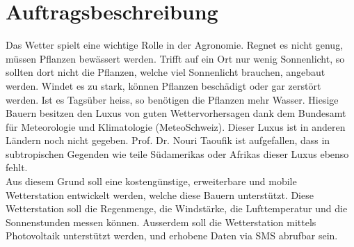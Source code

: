 \section{Auftragsbeschreibung}
Das Wetter spielt eine wichtige Rolle in der Agronomie. Regnet es nicht genug, müssen Pflanzen bewässert werden. Trifft auf ein Ort nur wenig Sonnenlicht, so sollten dort nicht die Pflanzen, welche viel Sonnenlicht brauchen, angebaut werden. Windet es zu stark, können Pflanzen beschädigt oder gar zerstört werden. Ist es Tagsüber heiss, so benötigen die Pflanzen mehr Wasser. Hiesige Bauern besitzen den Luxus von guten Wettervorhersagen dank dem Bundesamt für Meteorologie und Klimatologie (MeteoSchweiz). Dieser Luxus ist in anderen Ländern noch nicht gegeben. Prof. Dr. Nouri Taoufik ist aufgefallen, dass in subtropischen Gegenden wie teile Südamerikas oder Afrikas dieser Luxus ebenso fehlt. \\[0.5cm]
Aus diesem Grund soll eine kostengünstige, erweiterbare und mobile Wetterstation entwickelt werden, welche diese Bauern unterstützt. Diese Wetterstation soll die Regenmenge, die Windstärke, die Lufttemperatur und die Sonnenstunden messen können. Ausserdem soll die Wetterstation mittels Photovoltaik unterstützt werden, und erhobene Daten via SMS abrufbar sein. \\[0.5cm]
